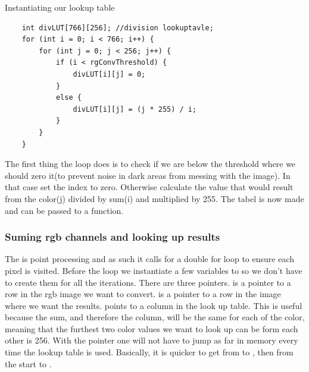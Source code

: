 \begin{listing}[H]
\caption{Instantiating our lookup table}
\label{listing:lutTable}
\begin{verbatim}
	int divLUT[766][256]; //division lookuptavle;
	for (int i = 0; i < 766; i++) {
		for (int j = 0; j < 256; j++) {
			if (i < rgConvThreshold) { 
				divLUT[i][j] = 0;
			}
			else {
				divLUT[i][j] = (j * 255) / i;
			}
		}
	}
\end{verbatim}
\end{listing}
The first thing the loop does is to check if we are below the threshold where we should zero it(to prevent noise in dark areas from messing with the image). In that case  set the index to zero. Otherwise calculate the value that would result from the color(j) divided by sum(i) and multiplied by 255.
The tabel is now made and can be passed to a function. 
\subsubsection{Suming rgb channels and looking up results}
The is point processing and as such it calls for a double for loop to ensure each pixel is visited. Before the loop we instantiate a few variables to so we don't have to create them for all the iterations. There are three pointers.  is a pointer to a row in the rgb image we want to convert.  is a pointer to a row in the image where we want the results.  points to a column in the look up table. This is useful because the sum, and therefore the column, will be the same for each of the color, meaning that the furthest two color values we want to look up can be form each other is 256. With the pointer one will not have to jump as far in memory every time the lookup table is used. Basically, it is quicker to get from  to , then from the start to . 

